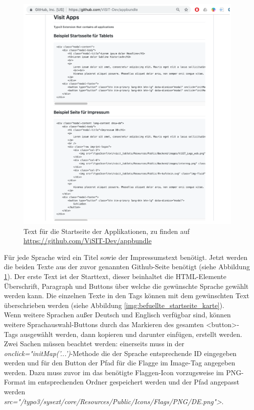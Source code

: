 \begin{figure}[ht!]
\centering
\includegraphics[width=12cm]{Figures/paula/github_link.png}
\caption{Text für die Startseite der Applikationen, zu finden auf \url{https://github.com/ViSIT-Dev/appbundle}}
\label{img:github_link}
\end{figure}

Für jede Sprache wird ein Titel sowie der Impressumstext benötigt. Jetzt werden die beiden Texte aus der zuvor genannten Github-Seite benötigt (siehe Abbildung \ref{img:github_link}). Der erste Text ist der Starttext, dieser beinhaltet die HTML-Elemente Überschrift, Paragraph und Buttons über welche die gewünschte Sprache gewählt werden kann. Die einzelnen Texte in den Tags können mit dem gewünschten Text überschrieben werden (siehe Abbildung \ref{img:befuellte_startseite_karte}).\\
Wenn weitere Sprachen außer Deutsch und Englisch verfügbar sind, können weitere Sprachauswahl-Buttons durch das Markieren des gesamten <button>-Tags ausgewählt werden, dann kopieren und darunter einfügen, erstellt werden. Zwei Sachen müssen beachtet werden: einerseits muss in der \textit{onclick="initMap('...')}-Methode die der Sprache entsprechende ID eingegeben werden und für den Button der Pfad für die Flagge im Image-Tag angegeben werden. Dazu muss zuvor im das benötigte Flaggen-Icon vorzugsweise im PNG-Format im entsprechenden Ordner gespeichert werden und der Pfad angepasst werden\\ \textit{src="/typo3/sysext/core/Resources/Public/Icons/Flags/PNG/DE.png">}. 

